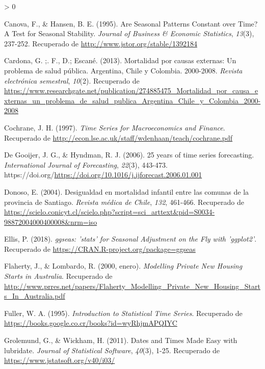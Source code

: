 \documentclass[
]{article}
\newlength{\cslhangindent}
\newenvironment{CSLReferences}[2] %
 {%
  \setlength{\parindent}{0pt}
  \ifodd #1 \everypar{\setlength{\hangindent}{\cslhangindent}}\ignorespaces\fi
  \ifnum #2 > 0
  \setlength{\parskip}{#2\baselineskip}
  \fi
 }%
 {}
\begin{document}
\begin{CSLReferences}{1}{0}
\leavevmode\hypertarget{ref-10.2307ux2f1392184}{}%
Canova, F., \& Hansen, B. E. (1995). Are Seasonal Patterns Constant over
Time? A Test for Seasonal Stability. \emph{Journal of Business \&
Economic Statistics}, \emph{13}(3), 237-252. Recuperado de
\url{http://www.jstor.org/stable/1392184}

\leavevmode\hypertarget{ref-ccpexternas}{}%
Cardona, G. ;. F., D.; Escané. (2013). Mortalidad por causas externas:
Un problema de salud pública. Argentina, Chile y Colombia. 2000-2008.
\emph{Revista electrónica semestral}, \emph{10}(2). Recuperado de
\url{https://www.researchgate.net/publication/274885475_Mortalidad_por_causa_externas_un_problema_de_salud_publica_Argentina_Chile_y_Colombia_2000-2008}

\leavevmode\hypertarget{ref-Cochrane}{}%
Cochrane, J. H. (1997). \emph{Time Series for Macroeconomics and
Finance}. Recuperado de
\url{http://econ.lse.ac.uk/staff/wdenhaan/teach/cochrane.pdf}

\leavevmode\hypertarget{ref-tsa_decades}{}%
De Gooijer, J. G., \& Hyndman, R. J. (2006). 25 years of time series
forecasting. \emph{International Journal of Forecasting}, \emph{22}(3),
443-473.
https://doi.org/\url{https://doi.org/10.1016/j.ijforecast.2006.01.001}

\leavevmode\hypertarget{ref-donoso}{}%
Donoso, E. (2004). Desigualdad en mortalidad infantil entre las comunas
de la provincia de Santiago. \emph{Revista médica de Chile}, \emph{132},
461-466. Recuperado de
\url{https://scielo.conicyt.cl/scielo.php?script=sci_arttext\&pid=S0034-98872004000400008\&nrm=iso}

\leavevmode\hypertarget{ref-ggseas}{}%
Ellis, P. (2018). \emph{ggseas: 'stats' for Seasonal Adjustment on the
Fly with 'ggplot2'}. Recuperado de
\url{https://CRAN.R-project.org/package=ggseas}

\leavevmode\hypertarget{ref-Lombardo}{}%
Flaherty, J., \& Lombardo, R. (2000, enero). \emph{Modelling Private New
Housing Starts in Australia}. Recuperado de
\url{http://www.prres.net/papers/Flaherty_Modelling_Private_New_Housing_Starts_In_Australia.pdf}

\leavevmode\hypertarget{ref-fuller1995introduction}{}%
Fuller, W. A. (1995). \emph{Introduction to Statistical Time Series}.
Recuperado de \url{https://books.google.co.cr/books?id=wyRhjmAPQIYC}

\leavevmode\hypertarget{ref-lubridate}{}%
Grolemund, G., \& Wickham, H. (2011). Dates and Times Made Easy with
{lubridate}. \emph{Journal of Statistical Software}, \emph{40}(3), 1-25.
Recuperado de \url{https://www.jstatsoft.org/v40/i03/}


\end{CSLReferences}
\end{document}
